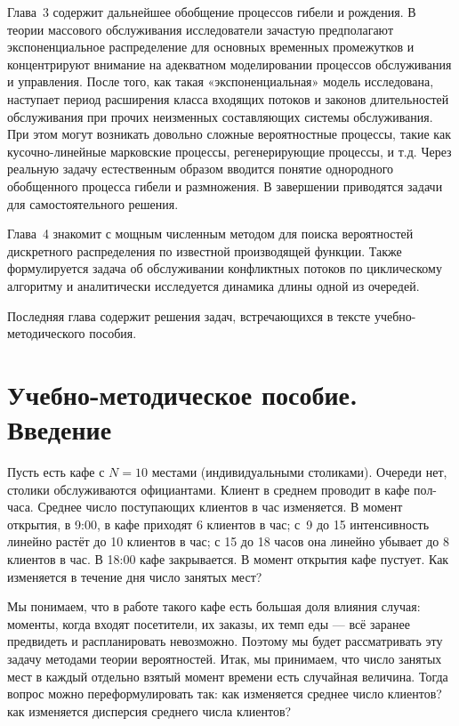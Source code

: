 \documentclass[14pt]{extarticle}
\theoremstyle{theorem}
\theoremstyle{remark}
\begin{document}
Глава~3 содержит дальнейшее обобщение процессов гибели и рождения. В теории массового обслуживания исследователи зачастую предполагают экспоненциальное распределение для основных временных промежутков и концентрируют внимание на адекватном моделировании процессов обслуживания и управления. После того, как такая «экспоненциальная» модель исследована, наступает период расширения класса входящих потоков и законов длительностей обслуживания при прочих неизменных составляющих системы обслуживания. При этом могут возникать довольно сложные вероятностные процессы, такие как кусочно-линейные марковские процессы, регенерирующие процессы, и т.д. Через реальную задачу естественным образом вводится понятие однородного обобщенного процесса гибели и размножения. В завершении приводятся задачи для самостоятельного решения.

Глава~4 знакомит с мощным численным методом для поиска вероятностей дискретного распределения по известной производящей функции. Также формулируется задача об обслуживании конфликтных потоков по циклическому алгоритму и аналитически исследуется динамика длины одной из очередей.

Последняя глава содержит решения задач, встречающихся в тексте учебно-методического пособия.



\newpage
\section{Учебно-методическое пособие. Введение}

Пусть есть кафе с $N=10$ местами (индивидуальными столиками). Очереди нет,
столики обслуживаются официантами. Клиент в среднем
проводит в кафе пол-часа. Среднее число поступающих клиентов в час изменяется. В
момент открытия, в 9:00, в кафе приходят 6 клиентов в час; с~9 до 15 интенсивность
линейно растёт до 10 клиентов в час; с 15 до 18 часов она линейно убывает до 8
клиентов в час. В 18:00 кафе закрывается. В момент открытия кафе пустует. Как
изменяется в течение дня число занятых мест?

Мы понимаем, что в работе такого кафе есть большая доля влияния случая: моменты,
когда входят посетители, их заказы, их темп еды --- всё заранее предвидеть и
распланировать невозможно. Поэтому мы будет рассматривать эту задачу методами
теории вероятностей. Итак, мы принимаем, что число занятых мест в каждый
отдельно взятый момент времени есть случайная величина. Тогда вопрос можно
переформулировать так: как изменяется среднее число клиентов? как изменяется
дисперсия среднего числа клиентов?
\end{document}
